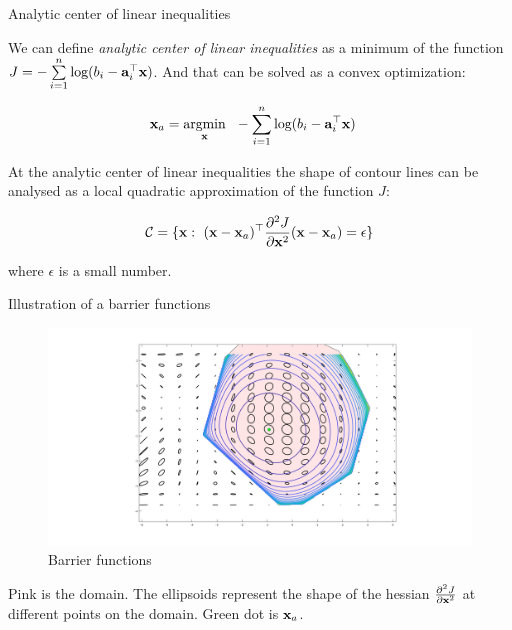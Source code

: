 \documentclass{beamer}
\begin{document}
\begin{frame}{Analytic center of linear inequalities}
\begin{flushleft}

We can define \emph{analytic center of linear inequalities} as a minimum of the function $J = -\sum\limits_{i = 1}^n \text{log} (b_i - \mathbf{a}_i^\top \mathbf{x})$. And that can be solved as a convex optimization:

\begin{align*}
    \bo{x}_a = \underset{\bo{x}}{\text{argmin}} & \ \  -\sum\limits_{i = 1}^n \text{log} (b_i - \bo{a}_i^\top \bo{x})
\end{align*}

At the analytic center of linear inequalities the shape of contour lines can be analysed as a local quadratic approximation of the function $J$:

\begin{equation}
    \mathcal{C} = \{ \mathbf{x}: \ (\mathbf{x} - \mathbf{x}_a)^\top \frac{\partial^2 J}{\partial \mathbf{x}^2} (\mathbf{x} - \mathbf{x}_a) = \epsilon \}
\end{equation}

where $\epsilon$ is a small number.
  
\end{flushleft}
\end{frame}



\begin{frame}{Illustration of a barrier functions}
\begin{flushleft}

\begin{figure}
    \centering
    \includegraphics[width=\linewidth]{LogBarrier2.png}
    \caption{Barrier functions}
    \label{fig:BarrierFunctions}
\end{figure}

Pink is the domain. The ellipsoids represent the shape of the hessian $\frac{\partial^2 J}{\partial \mathbf{x}^2}$ at different points on the domain. Green dot is $\mathbf{x}_a$.

\end{flushleft}
\end{frame}
\end{document}
